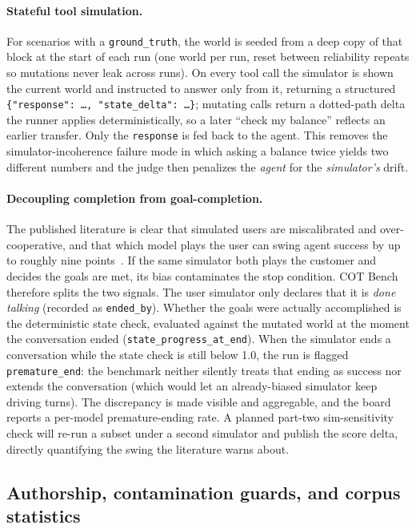 \paragraph{Stateful tool simulation.} For scenarios with a \texttt{ground\_truth},
the world is seeded from a deep copy of that block at the start of each run (one
world per run, reset between reliability repeats so mutations never leak across
runs). On every tool call the simulator is shown the current world and instructed
to answer only from it, returning a structured
\texttt{\{"response": \ldots, "state\_delta": \ldots\}}; mutating calls return a
dotted-path delta the runner applies deterministically, so a later ``check my
balance'' reflects an earlier transfer. Only the \texttt{response} is fed back to
the agent. This removes the simulator-incoherence failure mode in which asking a
balance twice yields two different numbers and the judge then penalizes the
\emph{agent} for the \emph{simulator's} drift.

\paragraph{Decoupling completion from goal-completion.} The published literature is
clear that simulated users are miscalibrated and over-cooperative, and that which
model plays the user can swing agent success by up to roughly nine
points~\cite{lostinsim2026,sim2real2026}. If the same simulator both plays the
customer and decides the goals are met, its bias contaminates the stop condition.
COT Bench therefore splits the two signals. The user simulator only declares that
it is \emph{done talking} (recorded as \texttt{ended\_by}). Whether the goals were
actually accomplished is the deterministic state check, evaluated against the
mutated world at the moment the conversation ended
(\texttt{state\_progress\_at\_end}). When the simulator ends a conversation while
the state check is still below 1.0, the run is flagged \texttt{premature\_end}: the
benchmark neither silently treats that ending as success nor extends the
conversation (which would let an already-biased simulator keep driving turns).
The discrepancy is made visible and aggregable, and the board reports a per-model
premature-ending rate. A planned part-two sim-sensitivity check will re-run a
subset under a second simulator and publish the score delta, directly quantifying
the swing the literature warns about.

\subsection{Authorship, contamination guards, and corpus statistics}

